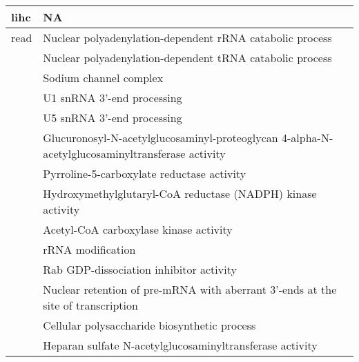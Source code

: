 \begin{appendices}
\begin{longtable}{lp{}}
	\hline
	\gls{lihc}                   & NA                                                                                              \\
	\hline
	\gls{read}                   & Nuclear polyadenylation-dependent rRNA catabolic process                                        \\
                                 & Nuclear polyadenylation-dependent tRNA catabolic process                                        \\
                                 & Sodium channel complex                                                                          \\
                                 & U1 snRNA 3'-end processing                                                                      \\
                                 & U5 snRNA 3'-end processing                                                                      \\
                                 & Glucuronosyl-N-acetylglucosaminyl-proteoglycan 4-alpha-N-acetylglucosaminyltransferase activity \\
                                 & Pyrroline-5-carboxylate reductase activity                                                      \\
                                 & Hydroxymethylglutaryl-CoA reductase (NADPH) kinase activity                                     \\
                                 & Acetyl-CoA carboxylase kinase activity                                                          \\
                                 & rRNA modification                                                                               \\
                                 & Rab GDP-dissociation inhibitor activity                                                         \\
                                 & Nuclear retention of pre-mRNA with aberrant 3'-ends at the site of transcription                \\
                                 & Cellular polysaccharide biosynthetic process                                                    \\
                                 & Heparan sulfate N-acetylglucosaminyltransferase activity                                        \\

\end{longtable}
\end{appendices}
